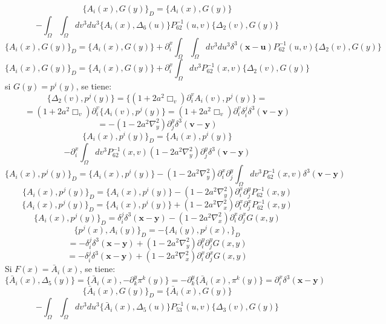 \documentclass[a4paper,12pt]{article}
\begin{document}
\begin{equation}
\{A_i(x),G(y)\}_D=\{A_i(x),G(y)\}
\end{equation} 
$$-\int_{\Omega}\int_\Omega dv^3du^3\{A_i(x),\Delta_6(u)\}P_{62}^{-1}(u,v)\{\Delta_2(v),G(y)\}$$
$$\{A_i(x),G(y)\}_D=\{A_i(x),G(y)\}+\partial_i^x\int_{\Omega}\int_\Omega dv^3du^3\delta^3(\textbf{x}-\textbf{u})P_{62}^{-1}(u,v)\{\Delta_2(v),G(y)\}
$$
$$\{A_i(x),G(y)\}_D=\{A_i(x),G(y)\}+\partial_i^x\int_\Omega dv^3P_{62}^{-1}(x,v)\{\Delta_2(v),G(y)\}
$$
si $G(y)=p^i(y)$, se tiene: 
\begin{equation}
\{\Delta_2(v),p^j(y)\}=\{(1+2a^2\Box_v)\partial_i^v A_i(v),p^{j}(y)\}=
\end{equation}
$$=(1+2a^2\Box_v)\partial_i^v \{A_i(v),p^{j}(y)\}=(1+2a^2\Box_v)\partial_i^v\delta^j_i\delta^3(\textbf{v}-\textbf{y})$$
$$=-(1-2a^2\nabla_y^2)\partial_j^y\delta^3(\textbf{v}-\textbf{y})$$
\begin{equation}
\{A_i(x),p^i(y)\}_D=\{A_i(x),p^i(y)\}
\end{equation}
$$-\partial_i^x\int_\Omega dv^3P_{62}^{-1}(x,v)(1-2a^2\nabla_y^2)\partial_j^y\delta^3(\textbf{v}-\textbf{y})$$
$$\{A_i(x),p^j(y)\}_D=\{A_i(x),p^i(y)\}-(1-2a^2\nabla^2_y)\partial_i^x\partial_j^y\int_\Omega dv^3P_{62}^{-1}(x,v)\delta^3(\textbf{v}-\textbf{y})
$$ 
$$\{A_i(x),p^j(y)\}_D=\{A_i(x),p^i(y)\}-(1-2a^2\nabla^2_y)\partial_i^x\partial_j^yP_{62}^{-1}(x,y)
$$ 
$$\{A_i(x),p^j(y)\}_D=\{A_i(x),p^i(y)\}+(1-2a^2\nabla^2_x)\partial_i^x\partial_j^xP_{62}^{-1}(x,y)
$$
\begin{equation}
\{A_i(x),p^j(y)\}_D=\delta^j_i\delta^3(\textbf{x}-\textbf{y})-(1-2a^2\nabla^2_x)\partial_i^x\partial_j^xG(x,y)
\end{equation}
\begin{equation}
\{p^j(x),A_i(y)\}_D=-\{A_i(y),p^j(x),\}_D
\end{equation}
$$=-\delta^j_i\delta^3(\textbf{x}-\textbf{y})+(1-2a^2\nabla^2_y)\partial_i^y\partial_j^yG(x,y)$$
$$=-\delta^j_i\delta^3(\textbf{x}-\textbf{y})+(1-2a^2\nabla^2_x)\partial_i^x\partial_j^xG(x,y)$$
Si $F(x)=\bar{A}_i(x)$, se tiene:
\begin{equation}
\{\bar{A}_i(x),\Delta_5(y)\}=\{\bar{A}_i(x),-\partial_k^y\pi^{k}(y)\}=-\partial_k^y\{\bar{A}_i(x),\pi^{k}(y)\}=\partial_i^x\delta^3(\textbf{x}-\textbf{y})
\end{equation}
\begin{equation}
\{\bar{A}_i(x),G(y)\}_D=\{\bar{A}_i(x),G(y)\}
\end{equation} 
$$-\int_{\Omega}\int_\Omega dv^3du^3\{\bar{A}_i(x),\Delta_5(u)\}P_{53}^{-1}(u,v)\{\Delta_3(v),G(y)\}$$
\end{document}
